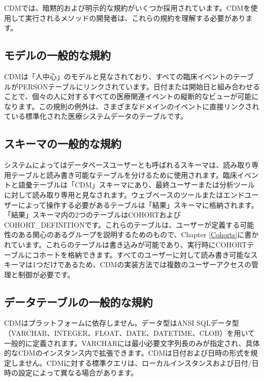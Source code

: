 \documentclass[
  11pt]{book}
\theoremstyle{definition}
\theoremstyle{definition}
\theoremstyle{definition}
\theoremstyle{definition}
\theoremstyle{remark}
\begin{document}
CDMでは、暗黙的および明示的な規約がいくつか採用されています。CDMを使用して実行されるメソッドの開発者は、これらの規約を理解する必要があります。

\subsection{モデルの一般的な規約}\label{model-Conv}

CDMは「人中心」のモデルと見なされており、すべての臨床イベントのテーブルがPERSONテーブルにリンクされています。日付または開始日と組み合わせることで、個々の人に対するすべての医療関連イベントの縦断的なビューが可能になります。この規則の例外は、さまざまなドメインのイベントに直接リンクされている標準化された医療システムデータのテーブルです。

\subsection{スキーマの一般的な規約}\label{ux30b9ux30adux30fcux30deux306eux4e00ux822cux7684ux306aux898fux7d04}

システムによってはデータベースユーザーとも呼ばれるスキーマは、読み取り専用テーブルと読み書き可能なテーブルを分けるために使用されます。臨床イベントと語彙テーブルは「CDM」スキーマにあり、最終ユーザーまたは分析ツールに対して読み取り専用と見なされます。ウェブベースのツールまたはエンドユーザーによって操作する必要があるテーブルは「結果」スキーマに格納されます。「結果」スキーマ内の2つのテーブルはCOHORTおよびCOHORT\_DEFINITIONです。これらのテーブルは、ユーザーが定義する可能性のある関心のあるグループを説明するためのもので、Chapter \ref{Cohorts}に書かれています。これらのテーブルは書き込みが可能であり、実行時にCOHORTテーブルにコホートを格納できます。すべてのユーザーに対して読み書き可能なスキーマは1つだけであるため、CDMの実装方法では複数のユーザーアクセスの管理と制御が必要です。

\subsection{データテーブルの一般的な規約}\label{ux30c7ux30fcux30bfux30c6ux30fcux30d6ux30ebux306eux4e00ux822cux7684ux306aux898fux7d04}

CDMはプラットフォームに依存しません。データ型はANSI SQLデータ型（VARCHAR、INTEGER、FLOAT、DATE、DATETIME、CLOB）を用いて一般的に定義されます。VARCHARには最小必要文字列長のみが指定され、具体的なCDMのインスタンス内で拡張できます。CDMは日付および日時の形式を規定しません。CDMに対する標準クエリは、ローカルインスタンスおよび日付/日時の設定によって異なる場合があります。
\end{document}
